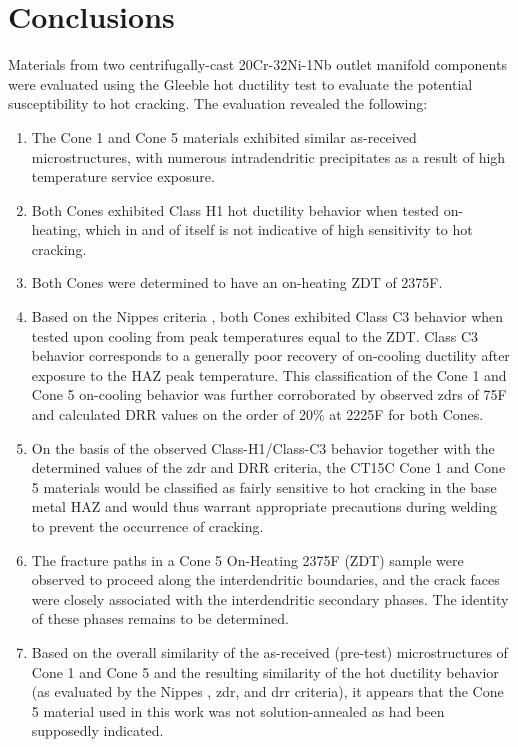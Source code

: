 \chapter{Conclusions} \label{ch:conclusions}
Materials from two centrifugally-cast 20Cr-32Ni-1Nb outlet manifold components were evaluated using the Gleeble hot ductility test to evaluate the potential susceptibility to hot cracking.  The evaluation revealed the following:

\begin{enumerate}
\item The Cone 1 and Cone 5 materials exhibited similar as-received microstructures, with numerous intradendritic precipitates as a result of high temperature service exposure.
\item Both Cones exhibited Class H1 hot ductility behavior when tested on-heating, which in and of itself is not indicative of high sensitivity to hot cracking.
\item Both Cones were determined to have an on-heating ZDT of 2375\textdegree{}F.
\item Based on the Nippes criteria \cite{nippes_further_1957}, both Cones exhibited Class C3 behavior when tested upon cooling from peak temperatures equal to the ZDT.  Class C3 behavior corresponds to a generally poor recovery of on-cooling ductility after exposure to the HAZ peak temperature.  This classification of the Cone 1 and Cone 5 on-cooling behavior was further corroborated by observed \gls{zdr}s of 75F\textdegree{} and calculated DRR values on the order of 20\% at 2225\textdegree{}F for both Cones.
\item On the basis of the observed Class-H1/Class-C3 behavior together with the determined values of the \gls{zdr} and DRR criteria, the CT15C Cone 1 and Cone 5 materials would be classified as fairly sensitive to hot cracking in the base metal HAZ and would thus warrant appropriate precautions during welding to prevent the occurrence of cracking.
\item The fracture paths in a Cone 5 On-Heating 2375\textdegree{}F (ZDT) sample were observed to proceed along the interdendritic boundaries, and the crack faces were closely associated with the interdendritic secondary phases.  The identity of these phases remains to be determined.
\item Based on the overall similarity of the as-received (pre-test) microstructures of Cone 1 and Cone 5 and the resulting similarity of the hot ductility behavior (as evaluated by the Nippes \cite{nippes_further_1957}, \gls{zdr}, and \gls{drr} criteria), it appears that the Cone 5 material used in this work was not solution-annealed as had been supposedly indicated.
\end{enumerate}



